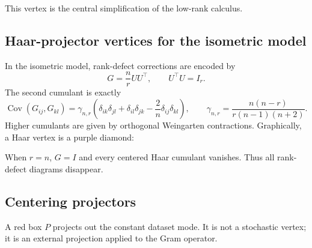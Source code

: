 \documentclass[11pt]{article}
\newcommand{\Cov}{\operatorname{Cov}}
\begin{document}
\begin{center}
\end{center}

This vertex is the central simplification of the low-rank calculus.

\subsection{Haar-projector vertices for the isometric model}

In the isometric model, rank-defect corrections are encoded by
\[
G=\frac nr UU^\top,
\qquad U^\top U=I_r.
\]
The second cumulant is exactly
\begin{equation}
\Cov(G_{ij},G_{kl})
=\gamma_{n,r}\left(\delta_{ik}\delta_{jl}+\delta_{il}\delta_{jk}-\frac2n\delta_{ij}\delta_{kl}\right),
\qquad
\gamma_{n,r}=\frac{n(n-r)}{r(n-1)(n+2)}.
\label{eq:haar-cov}
\end{equation}
Higher cumulants are given by orthogonal Weingarten contractions.  Graphically, a Haar vertex is a purple diamond:

\begin{center}
\end{center}

When $r=n$, $G=I$ and every centered Haar cumulant vanishes.  Thus all rank-defect diagrams disappear.

\subsection{Centering projectors}

A red box $P$ projects out the constant dataset mode.  It is not a stochastic vertex; it is an external projection applied to the Gram operator.

\begin{center}
\end{center}
\end{document}
